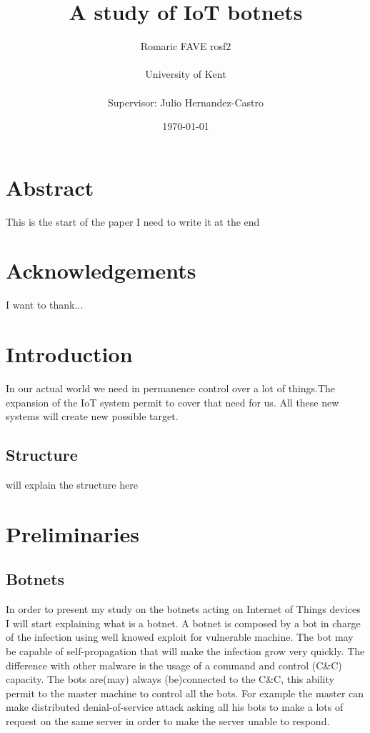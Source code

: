 \documentclass{report}
\date{\monthyeardate\today}
\begin{document}
\title{A study of IoT botnets}
\author{Romaric FAVE rosf2\\
  \\
  University of Kent\\
  \\
  Supervisor: Julio Hernandez-Castro
}

\maketitle

\tableofcontents

\chapter*{Abstract}
This is the start of the paper I need to write it at the end

\chapter*{Acknowledgements}
I want to thank...

\chapter{Introduction}
In our actual world we need in permanence control over a lot of things.The expansion of the IoT system permit to cover that need for us. All these new systems will create new possible target.

\section{Structure}
will explain the structure here

\chapter{Preliminaries}
\section{Botnets}
In order to present my study on the botnets acting on Internet of Things devices I will start explaining what is a botnet. A botnet is composed by a bot in charge of the infection using well knowed exploit for vulnerable machine. The bot may be capable of self-propagation that will make the infection grow very quickly. The difference with other malware is the usage of a command and control (C\&C) capacity. The bots are(may) always (be)connected to the C\&C, this ability permit to the master machine to control all the bots. For example the master can make distributed denial-of-service attack asking all his bots to make a lots of request on the same server in order to make the server unable to respond.
\end{document}
